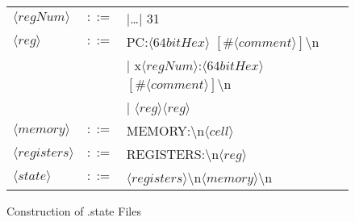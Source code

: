 \begin{figure}
\begin{tabular}{l c >{\ttfamily}l}
        $\langle regNum     \rangle$ & $::=$ & 0 |\dots | 31                                                                                      \\
        $\langle reg        \rangle$ & $::=$ & PC:$\langle 64bitHex\rangle$ $[\#\langle comment\rangle]$\textbackslash n                          \\
                                     &       & | x$\langle regNum\rangle$:$\langle64bitHex\rangle$ $[\#\langle comment\rangle]$\textbackslash n   \\
                                     &       & | $\langle reg\rangle\langle reg\rangle$                                                           \\
        $\langle memory     \rangle$ & $::=$ & MEMORY:\textbackslash n$\langle cell\rangle$                                                       \\
        $\langle registers  \rangle$ & $::=$ & REGISTERS:\textbackslash n$\langle reg\rangle$                                                     \\
        $\langle state      \rangle$ & $::=$ & $\langle registers\rangle$\textbackslash n$\langle memory\rangle$\textbackslash n                  \\

    \end{tabular}
    \caption[Construction of .state Files]{Construction of .state Files}
    \label{statefileform}
\end{figure}
